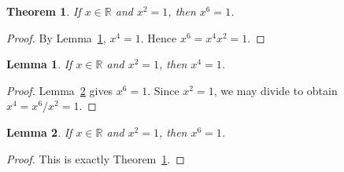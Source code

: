 \documentclass{article}
\newtheorem{theorem}{Theorem}
\newtheorem{lemma}{Lemma}
\begin{document}
\begin{theorem}\label{thm:deep-cycle-a}
If $x\in\mathbb R$ and $x^2=1$, then $x^6=1$.
\end{theorem}
\begin{proof}
By Lemma~\ref{lem:deep-cycle-b}, $x^4=1$. Hence
$x^6=x^4x^2=1$.
\end{proof}

\begin{lemma}\label{lem:deep-cycle-b}
If $x\in\mathbb R$ and $x^2=1$, then $x^4=1$.
\end{lemma}
\begin{proof}
Lemma~\ref{lem:deep-cycle-c} gives $x^6=1$. Since $x^2=1$,
we may divide to obtain $x^4=x^6/x^2=1$.
\end{proof}

\begin{lemma}\label{lem:deep-cycle-c}
If $x\in\mathbb R$ and $x^2=1$, then $x^6=1$.
\end{lemma}
\begin{proof}
This is exactly Theorem~\ref{thm:deep-cycle-a}.
\end{proof}
\end{document}
